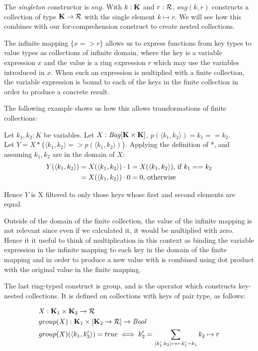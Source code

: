 {{{The \textit{singleton} constructor is $sng$. With $k: \mathbf{K}$ and $r: \mathcal{R}$, $sng(k,r)$ constructs a collection of type $\mathbf{K} \rightarrow \mathcal{R}$ with the single element $k  \mapsto r$. We will see how this combines with our for-comprehension construct to create nested collections.
 
The infinite mapping $\{x => r\}$ allows us to express functions from key types to value types as collections of infinite domain, where the key is a variable expression $x$ and the value is a ring expression $r$ which may use the variables introduced in $x$. When such an expression is multiplied with a finite collection, the variable expression is bound to each of the keys in the finite collection in order to produce a concrete result.

The following example shows us how this allows transformations of finite collections:

Let $k_1,k_2: K$ be variables. Let $X: \textrm{\textit{Bag}}[\mathbf{K} \times \mathbf{K}]$, $p(\langle k_1, k_2 \rangle) = k_1 == k_2$. \\
Let $Y = X * \{\langle k_1, k_2 \rangle => p(\langle k_1, k_2 \rangle)\}$. Applying the definition of *, and assuming $k_1,k_2$ are in the domain of $X$: \\
\begin{equation*}
\begin{split}
Y(\langle k_1, k_2 \rangle) &= X(\langle k_1, k_2 \rangle) \cdot 1 = X(\langle k_1, k_2 \rangle)\textrm{, if } k_1 == k_2 \\
&= X(\langle k_1, k_2 \rangle) \cdot 0 = 0\textrm{, otherwise}
\end{split}
\end{equation*}

Hence $Y$ is X filtered to only those keys whose first and second elements are equal.

Outside of the domain of the finite collection, the value of the infinite mapping is not relevant since even if we calculated it, it would be multiplied with zero. Hence it it useful to think of multiplication in this context as binding the variable expression in the infinite mapping to each key in the domain of the finite mapping and in order to produce a new value with is combined using dot product with the original value in the finite mapping.

The last ring-typed construct is group, and is the operator which constructs key-nested collections. It is defined on collections with keys of pair type, as follows:

\begin{equation*}
\begin{split}
&X: \mathbf{K}_1 \times \mathbf{K}_2 \rightarrow \mathcal{R} \\
&group(X): \mathbf{K}_1 \times [\mathbf{K}_2 \rightarrow \mathcal{R}] \rightarrow \textrm{\textit{Bool}} \\
&group(X)(\langle k_1, k_2' \rangle) = true \iff k_2' = \sum_{\langle k_1', k_2 \rangle \mapsto r : k_1' = k_1} {k_2 \mapsto r} 
\end{split}
\end{equation*}

}}}
